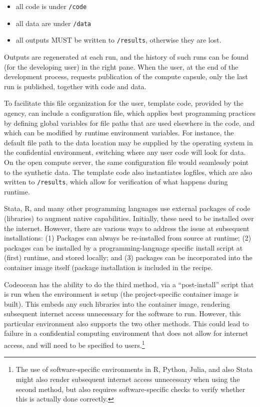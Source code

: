 \documentclass[]{hdsr}
\begin{document}
\begin{itemize}
    \item all code is under \texttt{/code}
    \item all data are under \texttt{/data}
    \item all outputs MUST be written to \texttt{/results}, otherwise they are lost.
\end{itemize}

Outputs are regenerated at each run, and the history of such runs can be found (for the developing user) in the right pane. When the user, at the end of the development process, requests publication of the compute capsule, only the last run is published, together with code and data.

To facilitate this file organization for the user,  template code, provided by the agency, can include a configuration file, which applies best programming practices by defining  global variables for file paths that are used elsewhere in the code, and which can be modified by runtime environment variables. For instance, the default file path to the data location may be supplied by the operating system in the confidential environment, switching where any user code will look for data. On the open compute server, the same configuration file would seamlessly point to the synthetic data. The template code also instantiates logfiles, which are also written to \texttt{/results}, which allow for verification of what happens during runtime.



Stata, R, and many other programming languages use external packages of code (libraries) to augment native capabilities. Initially, these need to be installed over the internet. However, there are various ways to address the issue at subsequent installations: (1) Packages can always be re-installed from source at runtime; (2) packages can be installed by a programming-language specific install script at (first) runtime, and stored locally; and (3) packages can be incorporated into the container image itself (package installation is included in the recipe.

Codeocean has the ability to do the third method, via a ``post-install'' script that is run when the environment is setup (the project-specific container image is built). This embeds any such libraries into the container image, rendering subsequent internet access unnecessary for the software to run. However, this particular environment also supports the two other methods. This could lead to failure in a confidential computing environment that does not allow for internet access, and will need to be specified to users.\footnote{The use of software-specific environments in R, Python, Julia, and also Stata might also render subsequent internet access unnecessary when using the second method, but also requires software-specific checks to verify whether this is actually done correctly.}
\end{document}
